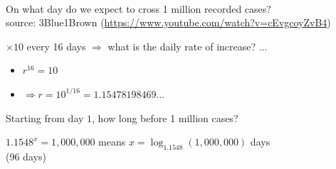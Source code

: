 \documentclass{beamer}
\renewcommand{\alert}[1]{\textcolor{MyTeal}{#1}}
\begin{document}
    \begin{frame}
    \begin{center}
      \\
      On what day do we expect to cross 1 million recorded cases?\\
      \alert{source:} 3Blue1Brown {\tiny (\url{https://www.youtube.com/watch?v=cEvgcoyZvB4})}
      \end{center}
    \end{frame}

    \begin{frame}
      $\times 10$ every 16 days $\Longrightarrow$ what is the daily rate of increase? $\ldots$

      \pause
      
      \bigskip     
      
      \begin{itemize}
      \item $r^{16} = 10$
        \item[] $\Longrightarrow r = 10^{1/16} = 1.15478198469\ldots$
        \end{itemize}

        \pause

        \bigskip

        Starting from day $1$, how long before 1 million cases?\\

        \begin{center}
        $1.1548^x = 1{,}000{,}000$ means $x = \log_{1.1548}(1{,}000{,}000)$ days\\
        \alert{(96 days)}
        \end{center}
      \end{frame}
\end{document}
